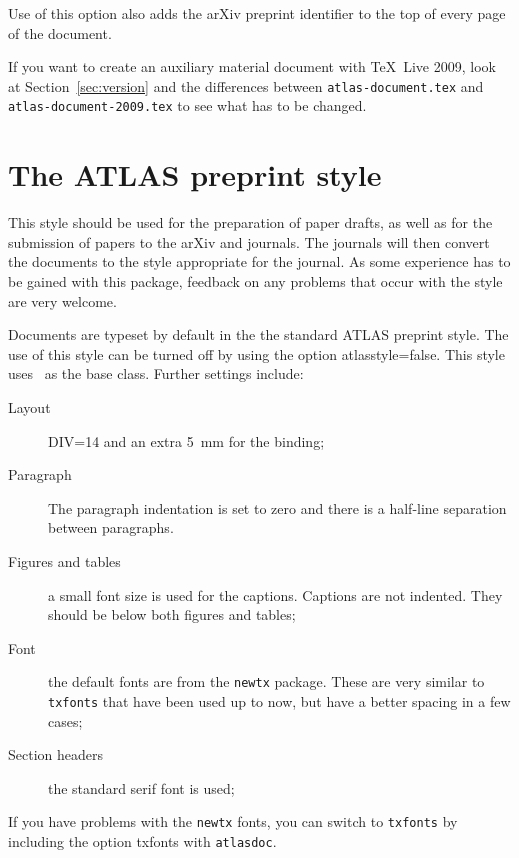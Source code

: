 \documentclass[UKenglish]{latex/atlasdoc}
\newcommand{\File}[1]{\texttt{#1}\xspace}
\newcommand{\Option}[1]{\textsf{#1}\xspace}
\newcommand{\Package}[1]{\texttt{#1}\xspace}
\begin{document}
Use of this option also adds the arXiv preprint identifier to the top of every page
of the document.

If you want to create an auxiliary material document with \TeX\ Live 2009, look
at Section~\ref{sec:version} and the differences between
\File{atlas-document.tex} and \File{atlas-document-2009.tex} to see what has to be changed.


\section{The ATLAS preprint style}
\label{sec:atlasstyle}

This style should be used for the preparation of paper drafts,
as well as for the submission of papers to the arXiv and journals.
The journals will then convert the documents to the style appropriate for the journal.
As some experience has to be gained with this package,
feedback on any problems that occur with the style are very welcome.

Documents are typeset by default in the the standard ATLAS preprint style.
The use of this style can be turned off by using the option
\Option{atlasstyle=false}.
This style uses \KOMAScript\ as the base class.
Further settings include:
\begin{description}
\item[Layout] \Option{DIV=14} and an extra \SI{5}{\mm} for the binding;
\item[Paragraph] The paragraph indentation is set to zero and 
  there is a half-line separation between paragraphs.
\item[Figures and tables] a small font size is used for the captions.
  Captions are not indented.
  They should be below both figures and tables;
\item[Font] the default fonts are from the \Package{newtx} package.
  These are very similar to \Package{txfonts} that have been used up to now,
  but have a better spacing in a few cases;
\item[Section headers] the standard serif font is used;
\end{description}

If you have problems with the \Package{newtx} fonts,
you can switch to \Package{txfonts} by including the option \Option{txfonts} with \Package{atlasdoc}.


\end{document}
